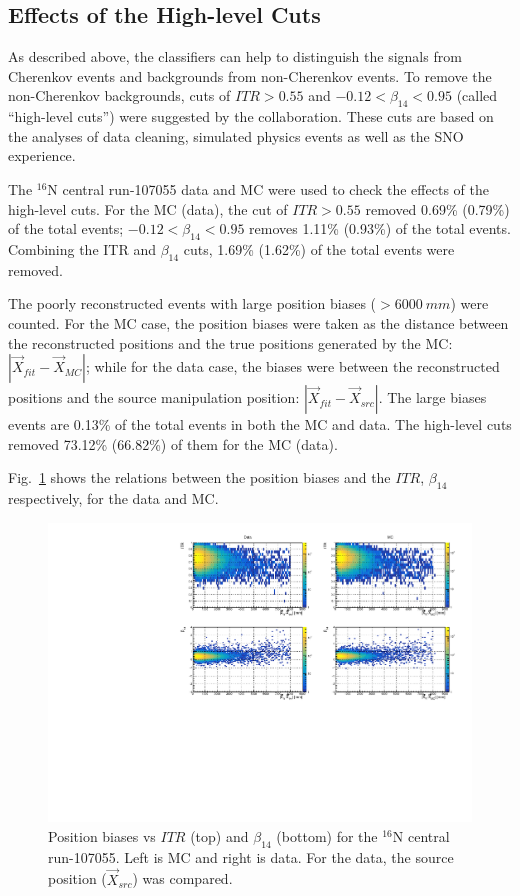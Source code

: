 \subsection{Effects of the High-level Cuts}
As described above, the classifiers can help to distinguish the signals from Cherenkov events and backgrounds from non-Cherenkov events. To remove the non-Cherenkov backgrounds, cuts of $ITR>0.55$ and $-0.12<\beta_{14}<0.95$ (called ``high-level cuts'') were suggested by the collaboration\cite{waterunidoc}. These cuts are based on the analyses of data cleaning, simulated physics events as well as the SNO experience\cite{waterunidoc,marzec2019measurement,dunmore2004separation}.

The $^{16}$N central run-107055 data and MC were used to check the effects of the high-level cuts. For the MC (data), the cut of $ITR>0.55$ removed 0.69\% (0.79\%) of the total events; $-0.12<\beta_{14}<0.95$ removes 1.11\% (0.93\%) of the total events. Combining the ITR and $\beta_{14}$ cuts, 1.69\% (1.62\%) of the total events were removed.

The poorly reconstructed events with large position biases ($>6000~mm$) were counted.
For the MC case, the position biases were taken as the distance between the reconstructed positions and the true positions generated by the MC: $|\vec{X}_{fit}-\vec{X}_{MC}|$; while for the data case, the biases were between the reconstructed positions and the source manipulation position: $|\vec{X}_{fit}-\vec{X}_{src}|$. The large biases events are 0.13\% of the total events in both the MC and data. The high-level cuts removed 73.12\% (66.82\%) of them for the MC (data).

Fig.~\ref{n16_highLevelCut} shows the relations between the position biases and the $ITR$, $\beta_{14}$ respectively, for the data and MC.
\begin{figure}
	\centering
	\includegraphics[width=14cm]{N16_107055_highLevelCuts.pdf}
	\caption{Position biases vs $ITR$ (top) and $\beta_{14}$ (bottom) for the $^{16}$N central run-107055. Left is MC and right is data. For the data, the source position ($\vec{X}_{src}$) was compared.}
	\label{n16_highLevelCut}
\end{figure}

